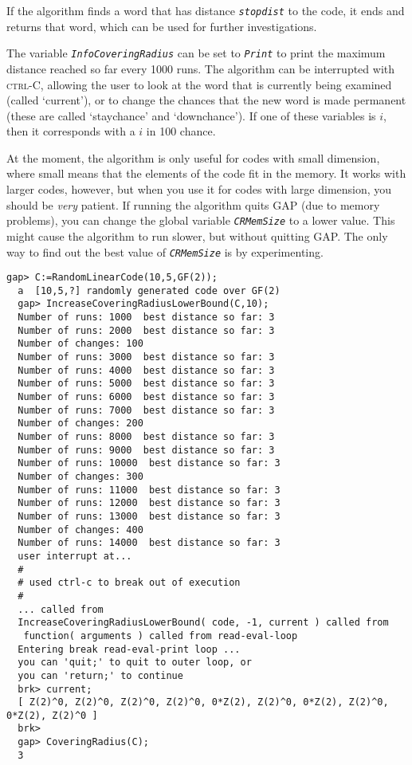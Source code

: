 \documentclass[a4paper,11pt]{report}
\begin{document}
{{{ If the algorithm finds a word that has distance \mbox{\texttt{\slshape stopdist}} to the code, it ends and returns that word, which can be used for further
investigations. 

 The variable \mbox{\texttt{\slshape InfoCoveringRadius}} can be set to \mbox{\texttt{\slshape Print}} to print the maximum distance reached so far every 1000 runs. The algorithm
can be interrupted with \textsc{ctrl-C}, allowing the user to look at the word that is currently being examined
(called `current'), or to change the chances that the new word is made
permanent (these are called `staychance' and `downchance'). If one of these
variables is $i$, then it corresponds with a $i$ in 100 chance. 

 At the moment, the algorithm is only useful for codes with small dimension,
where small means that the elements of the code fit in the memory. It works
with larger codes, however, but when you use it for codes with large
dimension, you should be \emph{very} patient. If running the algorithm quits GAP (due to memory problems), you can
change the global variable \mbox{\texttt{\slshape CRMemSize}} to a lower value. This might cause the algorithm to run slower, but without
quitting GAP. The only way to find out the best value of \mbox{\texttt{\slshape CRMemSize}} is by experimenting. }

 
\begin{Verbatim}[fontsize=\small,frame=single,label=Example]
  gap> C:=RandomLinearCode(10,5,GF(2));
  a  [10,5,?] randomly generated code over GF(2)
  gap> IncreaseCoveringRadiusLowerBound(C,10);
  Number of runs: 1000  best distance so far: 3
  Number of runs: 2000  best distance so far: 3
  Number of changes: 100
  Number of runs: 3000  best distance so far: 3
  Number of runs: 4000  best distance so far: 3
  Number of runs: 5000  best distance so far: 3
  Number of runs: 6000  best distance so far: 3
  Number of runs: 7000  best distance so far: 3
  Number of changes: 200
  Number of runs: 8000  best distance so far: 3
  Number of runs: 9000  best distance so far: 3
  Number of runs: 10000  best distance so far: 3
  Number of changes: 300
  Number of runs: 11000  best distance so far: 3
  Number of runs: 12000  best distance so far: 3
  Number of runs: 13000  best distance so far: 3
  Number of changes: 400
  Number of runs: 14000  best distance so far: 3
  user interrupt at... 
  #
  # used ctrl-c to break out of execution
  #
  ... called from 
  IncreaseCoveringRadiusLowerBound( code, -1, current ) called from
   function( arguments ) called from read-eval-loop
  Entering break read-eval-print loop ...
  you can 'quit;' to quit to outer loop, or
  you can 'return;' to continue
  brk> current;
  [ Z(2)^0, Z(2)^0, Z(2)^0, Z(2)^0, 0*Z(2), Z(2)^0, 0*Z(2), Z(2)^0, 0*Z(2), Z(2)^0 ]
  brk>
  gap> CoveringRadius(C);
  3
  

\end{Verbatim}}}
\end{document}
